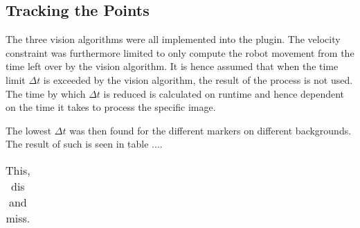 \subsection{Tracking the Points}
The three vision algorithms were all implemented into the plugin.
The velocity constraint was furthermore limited to only compute the robot movement from the time left over by the vision algorithm.
It is hence assumed that when the time limit $\Delta t$ is exceeded by the vision algorithm, the result of the process is not used.
The time by which $\Delta t$ is reduced is calculated on runtime and hence dependent on the time it takes to process the specific image.

The lowest $\Delta t$ was then found for the different markers on different backgrounds.
The result of such is seen in table ....


\begin{table}[H]
\begin{tabular}{|c|c|c|c|}

\end{tabular}
\caption{This, dis and miss.}
\end{table}



